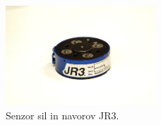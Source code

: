 \begin{figure}
	\centering
	\includegraphics[trim={5cm 5cm 5cm 5cm},clip,width=0.5\textwidth]{./Slike/jr3-slika.png}
	\caption{Senzor sil in navorov JR3.}
	\label{fig:jr3-slika}
\end{figure}
